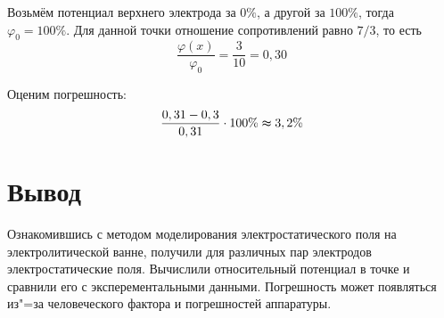 Возьмём потенциал верхнего электрода за $0\%$, а другой за $100\%$, тогда $\varphi_0 = 100\%$. Для данной точки отношение сопротивлений равно $7/3$, то есть
$$
  \frac{\varphi(x)}{\varphi_0} = \frac{3}{10} = 0,30
$$

Оценим погрешность:
$$
  \frac{0,31 - 0,3}{0,31} \cdot 100\% \thickapprox 3,2\%
$$

\section*{Вывод}
Ознакомившись с методом моделирования электростатического поля на электролитической ванне, получили для различных пар электродов электростатические поля. Вычислили относительный потенциал в точке и сравнили его с эксперементальными данными. Погрешность может появляться из"=за человеческого фактора и погрешностей аппаратуры.



